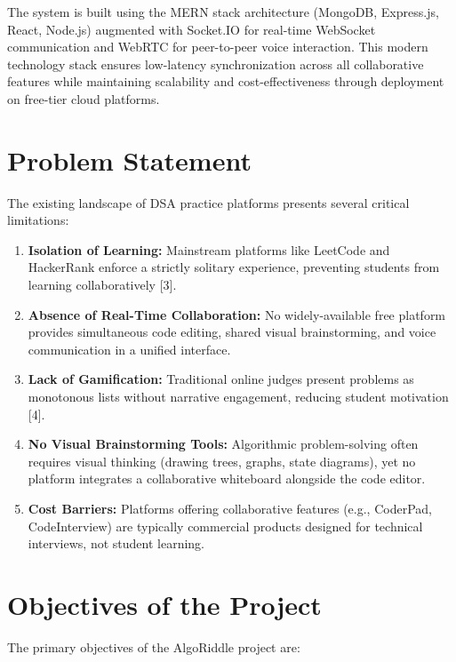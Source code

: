 \documentclass[12pt,a4paper,oneside]{report}
\begin{document}
The system is built using the MERN stack architecture (MongoDB, Express.js, React, Node.js) augmented with Socket.IO for real-time WebSocket communication and WebRTC for peer-to-peer voice interaction. This modern technology stack ensures low-latency synchronization across all collaborative features while maintaining scalability and cost-effectiveness through deployment on free-tier cloud platforms.

\section{Problem Statement}

The existing landscape of DSA practice platforms presents several critical limitations:

\begin{enumerate}[label=\arabic*.]
    \item \textbf{Isolation of Learning:} Mainstream platforms like LeetCode and HackerRank enforce a strictly solitary experience, preventing students from learning collaboratively [3].
    \item \textbf{Absence of Real-Time Collaboration:} No widely-available free platform provides simultaneous code editing, shared visual brainstorming, and voice communication in a unified interface.
    \item \textbf{Lack of Gamification:} Traditional online judges present problems as monotonous lists without narrative engagement, reducing student motivation [4].
    \item \textbf{No Visual Brainstorming Tools:} Algorithmic problem-solving often requires visual thinking (drawing trees, graphs, state diagrams), yet no platform integrates a collaborative whiteboard alongside the code editor.
    \item \textbf{Cost Barriers:} Platforms offering collaborative features (e.g., CoderPad, CodeInterview) are typically commercial products designed for technical interviews, not student learning.
\end{enumerate}

\section{Objectives of the Project}

The primary objectives of the AlgoRiddle project are:
\end{document}
